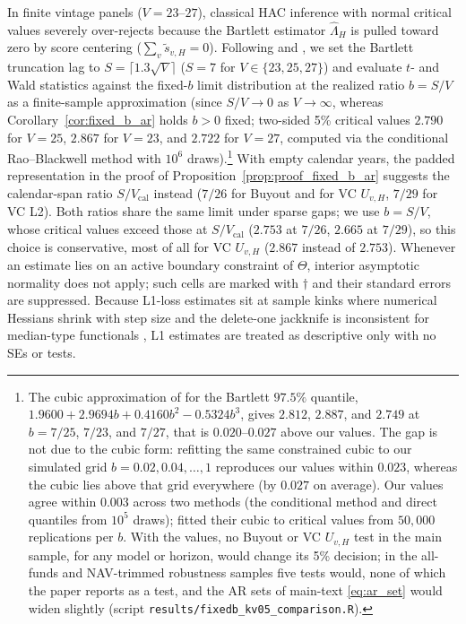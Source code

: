 In finite vintage panels ($V = 23$--$27$), classical HAC inference with normal critical values severely over-rejects because the Bartlett estimator $\hat\Lambda_H$ is pulled toward zero by score centering ($\sum_v \tilde{s}_{v,H} = 0$). Following \citet{LLSW18} and \citet{KV05}, we set the Bartlett truncation lag to $S = \lceil 1.3\sqrt{V}\rceil$ ($S=7$ for $V\in\{23,25,27\}$) and evaluate $t$- and Wald statistics against the fixed-$b$ limit distribution at the realized ratio $b = S/V$ as a finite-sample approximation (since $S/V \to 0$ as $V \to \infty$, whereas Corollary~\ref{cor:fixed_b_ar} holds $b > 0$ fixed; two-sided 5\% critical values $2.790$ for $V=25$, $2.867$ for $V=23$, and $2.722$ for $V=27$, computed via the conditional Rao--Blackwell method with $10^6$ draws).\footnote{The cubic approximation of \citet[Table~1]{KV05} for the Bartlett $97.5\%$ quantile, $1.9600 + 2.9694b + 0.4160b^2 - 0.5324b^3$, gives $2.812$, $2.887$, and $2.749$ at $b = 7/25$, $7/23$, and $7/27$, that is $0.020$--$0.027$ above our values. The gap is not due to the cubic form: refitting the same constrained cubic to our simulated grid $b = 0.02, 0.04, \dots, 1$ reproduces our values within $0.023$, whereas the \citet{KV05} cubic lies above that grid everywhere (by $0.027$ on average). Our values agree within $0.003$ across two methods (the conditional method and direct quantiles from $10^5$ draws); \citet{KV05} fitted their cubic to critical values from $50{,}000$ replications per $b$. With the \citet{KV05} values, no Buyout or VC $U_{v,H}$ test in the main sample, for any model or horizon, would change its 5\% decision; in the all-funds and NAV-trimmed robustness samples five tests would, none of which the paper reports as a test, and the AR sets of main-text \eqref{eq:ar_set} would widen slightly (script \texttt{results/fixedb\_kv05\_comparison.R}).} With empty calendar years, the padded representation in the proof of Proposition~\ref{prop:proof_fixed_b_ar} suggests the calendar-span ratio $S/V_{\mathrm{cal}}$ instead ($7/26$ for Buyout and for VC $U_{v,H}$, $7/29$ for VC L2). Both ratios share the same limit under sparse gaps; we use $b = S/V$, whose critical values exceed those at $S/V_{\mathrm{cal}}$ ($2.753$ at $7/26$, $2.665$ at $7/29$), so this choice is conservative, most of all for VC $U_{v,H}$ ($2.867$ instead of $2.753$). Whenever an estimate lies on an active boundary constraint of $\Theta$, interior asymptotic normality does not apply; such cells are marked with $\dagger$ and their standard errors are suppressed. Because L1-loss estimates sit at sample kinks where numerical Hessians shrink with step size and the delete-one jackknife is inconsistent for median-type functionals \citep{Efron79}, L1 estimates are treated as descriptive only with no SEs or tests.

